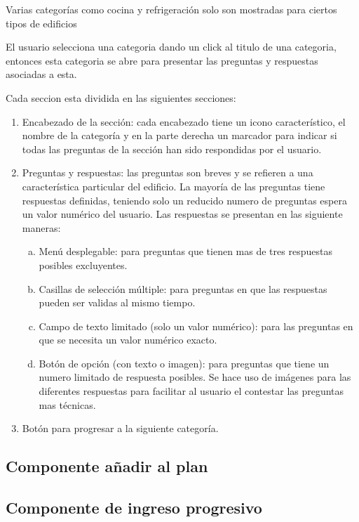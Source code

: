 Varias categorías como cocina y refrigeración solo son mostradas
para ciertos tipos de edificios


El usuario selecciona una categoria dando un click al titulo de una categoria,
entonces esta categoria se abre para presentar las preguntas y respuestas
asociadas a esta.

Cada seccion esta dividida en las siguientes secciones:
\begin{enumerate}
\item Encabezado de la sección: cada encabezado tiene un icono característico,
  el nombre de la categoría y en la parte derecha un marcador para indicar
  si todas las preguntas de la sección han sido respondidas por el usuario.
\item Preguntas y respuestas: las preguntas son breves y se refieren a una
  característica particular del edificio. La mayoría de las preguntas
  tiene respuestas definidas, teniendo solo un reducido numero de preguntas
  espera un valor numérico del usuario. Las respuestas se
  presentan en las siguiente maneras:
  \begin{enumerate}[a)]
  \item Menú desplegable: para preguntas que tienen mas de tres respuestas
    posibles excluyentes.
  \item Casillas de selección múltiple: para preguntas en que las respuestas
    pueden ser validas al mismo tiempo.
  \item Campo de texto limitado (solo un valor numérico): para las preguntas
    en que se necesita un valor numérico exacto.
  \item Botón de opción (con texto o imagen): para preguntas que tiene un
    numero limitado de respuesta posibles. Se hace uso de imágenes para las
    diferentes respuestas para facilitar al usuario el contestar las preguntas
    mas técnicas.
  \end{enumerate}
\item Botón para progresar a la siguiente categoría.
\end{enumerate}


\subsection{Componente añadir al plan}
\subsection{Componente de ingreso progresivo}
